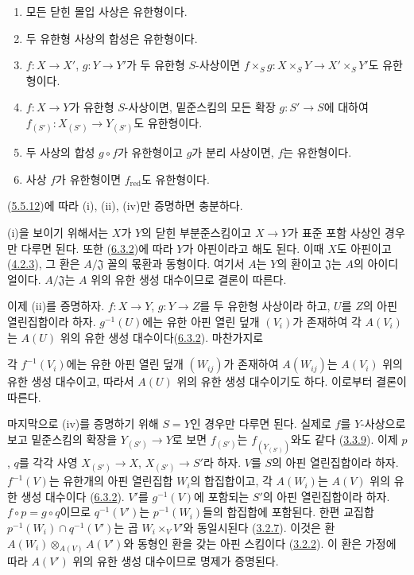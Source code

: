 \begin{proposition}[6.3.4]
\label{I.6.3.4-ko}
\begin{enumerate}
  \item[(i)] 모든 닫힌 몰입 사상은 유한형이다.
  \item[(ii)] 두 유한형 사상의 합성은 유한형이다.
  \item[(iii)] $f:X\to X'$, $g:Y\to Y'$가 두 유한형 $S$-사상이면
    $f\times_S g:X\times_S Y\to X'\times_S Y'$도 유한형이다.
  \item[(iv)] $f:X\to Y$가 유한형 $S$-사상이면, 밑준스킴의 모든 확장
    $g:S'\to S$에 대하여 $f_{(S')}:X_{(S')}\to Y_{(S')}$도 유한형이다.
  \item[(v)] 두 사상의 합성 $g\circ f$가 유한형이고 $g$가 분리
    사상이면, $f$는 유한형이다.
  \item[(vi)] 사상 $f$가 유한형이면 $f_{\mathrm{red}}$도 유한형이다.
\end{enumerate}
\end{proposition}

(\hyperref[I.5.5.12-ko]{5.5.12})에 따라 (i), (ii), (iv)만 증명하면
충분하다.

(i)을 보이기 위해서는 $X$가 $Y$의 닫힌 부분준스킴이고
$X\to Y$가 표준 포함 사상인 경우만 다루면 된다. 또한
(\hyperref[I.6.3.2-ko]{6.3.2})에 따라 $Y$가 아핀이라고 해도 된다.
이때 $X$도 아핀이고(\hyperref[I.4.2.3-ko]{4.2.3}), 그 환은
$A/\mathfrak{J}$ 꼴의 몫환과 동형이다. 여기서 $A$는 $Y$의 환이고
$\mathfrak{J}$는 $A$의 아이디얼이다. $A/\mathfrak{J}$는 $A$ 위의
유한 생성 대수이므로 결론이 따른다.

이제 (ii)를 증명하자. $f:X\to Y$, $g:Y\to Z$를 두 유한형 사상이라
하고, $U$를 $Z$의 아핀 열린집합이라 하자. $g^{-1}(U)$에는 유한 아핀
열린 덮개 $(V_i)$가 존재하여 각 $A(V_i)$는 $A(U)$ 위의 유한 생성
대수이다(\hyperref[I.6.3.2-ko]{6.3.2}). 마찬가지로

각 $f^{-1}(V_i)$에는 유한 아핀 열린 덮개 $(W_{ij})$가 존재하여
$A(W_{ij})$는 $A(V_i)$ 위의 유한 생성 대수이고, 따라서 $A(U)$ 위의
유한 생성 대수이기도 하다. 이로부터 결론이 따른다.

마지막으로 (iv)를 증명하기 위해 $S=Y$인 경우만 다루면 된다. 실제로
$f$를 $Y$-사상으로 보고 밑준스킴의 확장을 $Y_{(S')}\to Y$로 보면
$f_{(S')}$는 $f_{(Y_{(S')})}$와도 같다
(\hyperref[I.3.3.9-ko]{3.3.9}). 이제 $p$, $q$를 각각 사영
$X_{(S')}\to X$, $X_{(S')}\to S'$라 하자. $V$를 $S$의 아핀
열린집합이라 하자. $f^{-1}(V)$는 유한개의 아핀 열린집합 $W_i$의
합집합이고, 각 $A(W_i)$는 $A(V)$ 위의 유한 생성 대수이다
(\hyperref[I.6.3.2-ko]{6.3.2}). $V'$를 $g^{-1}(V)$에 포함되는 $S'$의
아핀 열린집합이라 하자. $f\circ p=g\circ q$이므로 $q^{-1}(V')$는
$p^{-1}(W_i)$들의 합집합에 포함된다. 한편 교집합
$p^{-1}(W_i)\cap q^{-1}(V')$는 곱 $W_i\times_V V'$와 동일시된다
(\hyperref[I.3.2.7-ko]{3.2.7}). 이것은 환
$A(W_i)\otimes_{A(V)}A(V')$와 동형인 환을 갖는 아핀 스킴이다
(\hyperref[I.3.2.2-ko]{3.2.2}). 이 환은 가정에 따라 $A(V')$ 위의
유한 생성 대수이므로 명제가 증명된다.

